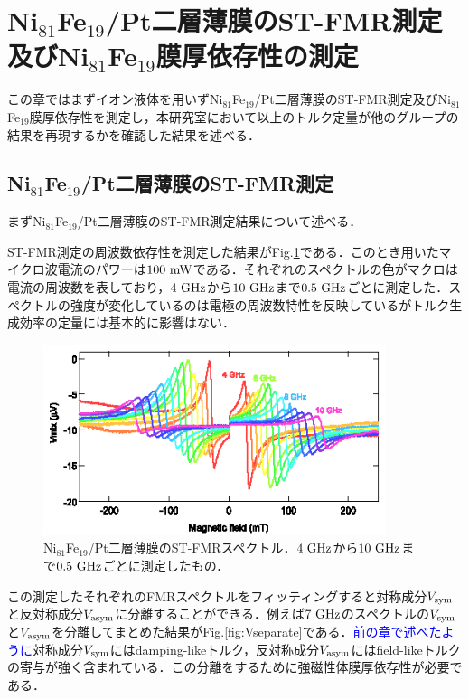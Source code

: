 \section{Ni$_{81}$Fe$_{19}$/Pt二層薄膜のST-FMR測定及びNi$_{81}$Fe$_{19}$膜厚依存性の測定}

この章ではまずイオン液体を用いずNi$_{81}$Fe$_{19}$/Pt二層薄膜のST-FMR測定及びNi$_{81}$Fe$_{19}$膜厚依存性を測定し，本研究室において以上のトルク定量が他のグループの結果を再現するかを確認した結果を述べる．

\subsection{Ni$_{81}$Fe$_{19}$/Pt二層薄膜のST-FMR測定}
まずNi$_{81}$Fe$_{19}$/Pt二層薄膜のST-FMR測定結果について述べる．

ST-FMR測定の周波数依存性を測定した結果がFig.\ref{fig:initial_FMR}である．このとき用いたマイクロ波電流のパワーは$100\rm\ mW$である．それぞれのスペクトルの色がマクロは電流の周波数を表しており，$4\rm\ GHz$から$10\rm\ GHz$まで$0.5\rm\ GHz$ごとに測定した．スペクトルの強度が変化しているのは電極の周波数特性を反映しているがトルク生成効率の定量には基本的に影響はない．

\begin{figure}[htbp]
\centerline{
\includegraphics[width=10cm]{images/initial_FMR.eps}
}
\caption{Ni$_{81}$Fe$_{19}$/Pt二層薄膜のST-FMRスペクトル．$4\rm\ GHz$から$10\rm\ GHz$まで$0.5\rm\ GHz$ごとに測定したもの．
}
\label{fig:initial_FMR} 
\end{figure}

この測定したそれぞれのFMRスペクトルをフィッティングすると対称成分$V_{\rm sym}$と反対称成分$V_{\rm asym}$に分離することができる．例えば$7\rm\ GHz$のスペクトルの$V_{\rm sym}$と$V_{\rm asym}$を分離してまとめた結果がFig.\ref{fig:Vseparate}である．\textcolor{blue}{前の章で述べたように}対称成分$V_{\rm sym}$にはdamping-likeトルク，反対称成分$V_{\rm asym}$にはfield-likeトルクの寄与が強く含まれている．この分離をするために強磁性体膜厚依存性が必要である．

